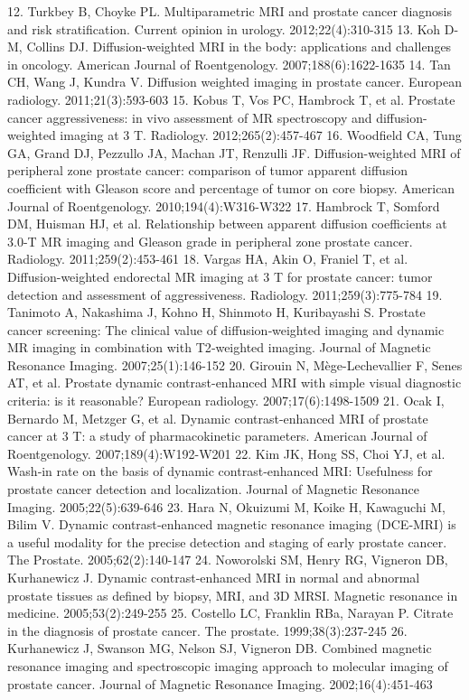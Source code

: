 12.	Turkbey B, Choyke PL. Multiparametric MRI and prostate cancer diagnosis and risk stratification. Current opinion in urology. 2012;22(4):310-315 %
13.	Koh D-M, Collins DJ. Diffusion-weighted MRI in the body: applications and challenges in oncology. American Journal of Roentgenology. 2007;188(6):1622-1635 %
14.	Tan CH, Wang J, Kundra V. Diffusion weighted imaging in prostate cancer. European radiology. 2011;21(3):593-603 %
15.	Kobus T, Vos PC, Hambrock T, et al. Prostate cancer aggressiveness: in vivo assessment of MR spectroscopy and diffusion-weighted imaging at 3 T. Radiology. 2012;265(2):457-467 %
16.	Woodfield CA, Tung GA, Grand DJ, Pezzullo JA, Machan JT, Renzulli JF. Diffusion-weighted MRI of peripheral zone prostate cancer: comparison of tumor apparent diffusion coefficient with Gleason score and percentage of tumor on core biopsy. American Journal of Roentgenology. 2010;194(4):W316-W322 %
17.	Hambrock T, Somford DM, Huisman HJ, et al. Relationship between apparent diffusion coefficients at 3.0-T MR imaging and Gleason grade in peripheral zone prostate cancer. Radiology. 2011;259(2):453-461 %
18.	Vargas HA, Akin O, Franiel T, et al. Diffusion-weighted endorectal MR imaging at 3 T for prostate cancer: tumor detection and assessment of aggressiveness. Radiology. 2011;259(3):775-784 %
19.	Tanimoto A, Nakashima J, Kohno H, Shinmoto H, Kuribayashi S. Prostate cancer screening: The clinical value of diffusion‐weighted imaging and dynamic MR imaging in combination with T2‐weighted imaging. Journal of Magnetic Resonance Imaging. 2007;25(1):146-152 %
20.	Girouin N, Mège-Lechevallier F, Senes AT, et al. Prostate dynamic contrast-enhanced MRI with simple visual diagnostic criteria: is it reasonable? European radiology. 2007;17(6):1498-1509 %
21.	Ocak I, Bernardo M, Metzger G, et al. Dynamic contrast-enhanced MRI of prostate cancer at 3 T: a study of pharmacokinetic parameters. American Journal of Roentgenology. 2007;189(4):W192-W201 %
22.	Kim JK, Hong SS, Choi YJ, et al. Wash‐in rate on the basis of dynamic contrast‐enhanced MRI: Usefulness for prostate cancer detection and localization. Journal of Magnetic Resonance Imaging. 2005;22(5):639-646 %
23.	Hara N, Okuizumi M, Koike H, Kawaguchi M, Bilim V. Dynamic contrast‐enhanced magnetic resonance imaging (DCE‐MRI) is a useful modality for the precise detection and staging of early prostate cancer. The Prostate. 2005;62(2):140-147 %
24.	Noworolski SM, Henry RG, Vigneron DB, Kurhanewicz J. Dynamic contrast‐enhanced MRI in normal and abnormal prostate tissues as defined by biopsy, MRI, and 3D MRSI. Magnetic resonance in medicine. 2005;53(2):249-255 %
25.	Costello LC, Franklin RBa, Narayan P. Citrate in the diagnosis of prostate cancer. The prostate. 1999;38(3):237-245 %
26.	Kurhanewicz J, Swanson MG, Nelson SJ, Vigneron DB. Combined magnetic resonance imaging and spectroscopic imaging approach to molecular imaging of prostate cancer. Journal of Magnetic Resonance Imaging. 2002;16(4):451-463 %


